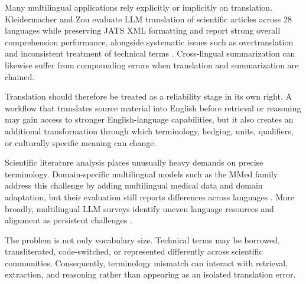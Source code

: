 \documentclass[acmsmall,nonacm]{acmart}
\begin{document}
Many multilingual applications rely explicitly or implicitly on translation. Kleidermacher and Zou evaluate LLM translation of scientific articles across 28 languages while preserving JATS XML formatting and report strong overall comprehension performance, alongside systematic issues such as overtranslation and inconsistent treatment of technical terms \cite{Kleidermacher2025}. Cross-lingual summarization can likewise suffer from compounding errors when translation and summarization are chained.

Translation should therefore be treated as a reliability stage in its own right. A workflow that translates source material into English before retrieval or reasoning may gain access to stronger English-language capabilities, but it also creates an additional transformation through which terminology, hedging, units, qualifiers, or culturally specific meaning can change.

Scientific literature analysis places unusually heavy demands on precise terminology. Domain-specific multilingual models such as the MMed family address this challenge by adding multilingual medical data and domain adaptation, but their evaluation still reports differences across languages \cite{Qiu2024}. More broadly, multilingual LLM surveys identify uneven language resources and alignment as persistent challenges \cite{Qin2025}.

The problem is not only vocabulary size. Technical terms may be borrowed, transliterated, code-switched, or represented differently across scientific communities. Consequently, terminology mismatch can interact with retrieval, extraction, and reasoning rather than appearing as an isolated translation error.
\end{document}
